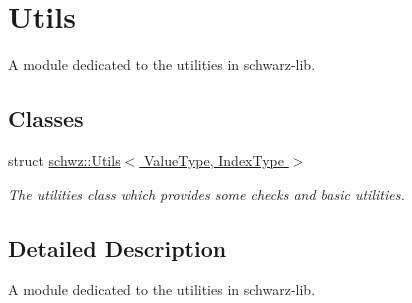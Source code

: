 \hypertarget{group__utils}{}\section{Utils}
\label{group__utils}


A module dedicated to the utilities in schwarz-\/lib.  


\subsection*{Classes}
\begin{DoxyCompactItemize}
\item 
struct \hyperlink{structschwz_1_1Utils}{schwz\+::\+Utils$<$ Value\+Type, Index\+Type $>$}
\begin{DoxyCompactList}\small\item\em The utilities class which provides some checks and basic utilities. \end{DoxyCompactList}\end{DoxyCompactItemize}


\subsection{Detailed Description}
A module dedicated to the utilities in schwarz-\/lib. 


